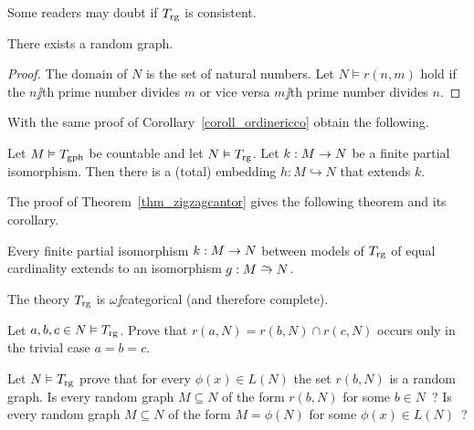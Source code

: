 \documentclass[creche.tex]{subfiles}
\begin{document}
Some readers may doubt if $T_{\rm rg}$ is consistent.

\begin{proposition}
There exists a random graph.
\end{proposition}
\begin{proof}
The domain of $N$ is the set of natural numbers. Let $N\models r(n,m)$ hold if the $n\jj$th prime number divides $m$ or vice versa $m\jj$th prime number divides $n$.
\end{proof}


With the same proof of Corollary~\ref{coroll_ordinericco} obtain the following.

\begin{corollary}\label{coroll_graforicco}
Let $M\models T_{\rm gph}$ be countable and let $N\models T_{\rm rg}$. Let $k:M\imp N$ be a finite partial isomorphism. Then there is a (total) embedding $h:M\hookrightarrow N$ that extends $k$.\QED
\end{corollary}

The proof of Theorem~\ref{thm_zigzagcantor} gives the following theorem and its corollary.

\begin{theorem}\label{gaomegacat}
Every finite partial isomorphism $k:M\imp N$ between models of $T_{\rm rg}$ of equal cardinality extends to an isomorphism $g:M\isomap N$.\QED
\end{theorem}

\begin{corollary}
The theory $T_{\rm rg}$ is $\omega\jj$categorical (and therefore complete).\QED
\end{corollary}

\begin{exercise}
Let $a,b,c\in N\models T_{\rm rg}$. Prove that $r(a,N)=r(b,N)\cap r(c,N)$ occurs only in the trivial case $a=b=c$.\QED
\end{exercise}

\begin{exercise}
Let $N\models T_{\rm rg}$ prove that for every $\phi(x)\in L(N)$ the set $r(b,N)$ is a random graph. Is every random graph $M\subseteq N$ of the form $r(b,N)$ for some $b\in N$~? Is every random graph $M\subseteq N$ of the form $M=\phi(N)$ for some $\phi(x)\in L(N)$~?\QED
\end{exercise}

\end{document}

